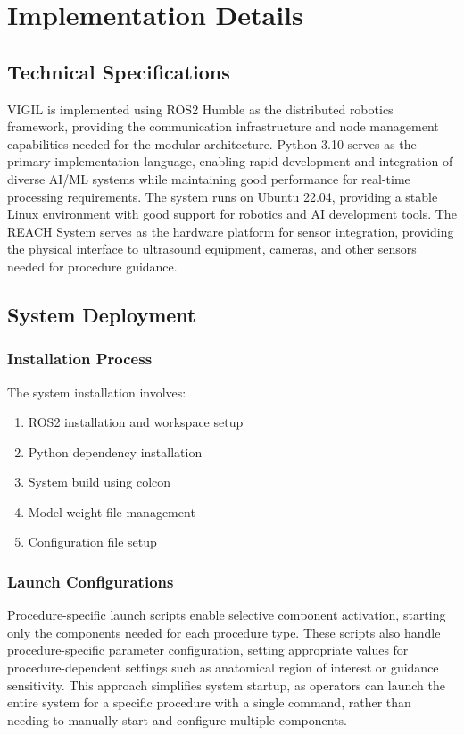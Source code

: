 \documentclass[12pt,a4paper]{article}
\begin{document}
\section{Implementation Details}

\subsection{Technical Specifications}

VIGIL is implemented using ROS2 Humble as the distributed robotics framework, providing the communication infrastructure and node management capabilities needed for the modular architecture. Python 3.10 serves as the primary implementation language, enabling rapid development and integration of diverse AI/ML systems while maintaining good performance for real-time processing requirements. The system runs on Ubuntu 22.04, providing a stable Linux environment with good support for robotics and AI development tools. The REACH System serves as the hardware platform for sensor integration, providing the physical interface to ultrasound equipment, cameras, and other sensors needed for procedure guidance.

\subsection{System Deployment}

\subsubsection{Installation Process}

The system installation involves:

\begin{enumerate}
    \item ROS2 installation and workspace setup
    \item Python dependency installation
    \item System build using colcon
    \item Model weight file management
    \item Configuration file setup
\end{enumerate}

\subsubsection{Launch Configurations}

Procedure-specific launch scripts enable selective component activation, starting only the components needed for each procedure type. These scripts also handle procedure-specific parameter configuration, setting appropriate values for procedure-dependent settings such as anatomical region of interest or guidance sensitivity. This approach simplifies system startup, as operators can launch the entire system for a specific procedure with a single command, rather than needing to manually start and configure multiple components.
\end{document}
